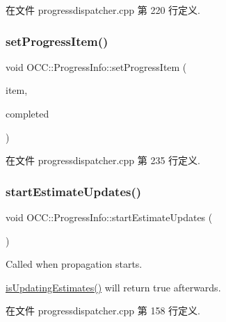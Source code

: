 在文件 progressdispatcher.\+cpp 第 220 行定义.

\mbox{\label{class_o_c_c_1_1_progress_info_ad252ffcad193d4573c318674b1f51e97}} 
\subsubsection{\texorpdfstring{set\+Progress\+Item()}{setProgressItem()}}
{\footnotesize\ttfamily void O\+C\+C\+::\+Progress\+Info\+::set\+Progress\+Item (\begin{DoxyParamCaption}\item[{const \hyperlink{class_o_c_c_1_1_sync_file_item}{Sync\+File\+Item} \&}]{item,  }\item[{quint64}]{completed }\end{DoxyParamCaption})}



在文件 progressdispatcher.\+cpp 第 235 行定义.

\mbox{\label{class_o_c_c_1_1_progress_info_a07894c5202d9f21cb23ce308900c8415}} 
\subsubsection{\texorpdfstring{start\+Estimate\+Updates()}{startEstimateUpdates()}}
{\footnotesize\ttfamily void O\+C\+C\+::\+Progress\+Info\+::start\+Estimate\+Updates (\begin{DoxyParamCaption}{ }\end{DoxyParamCaption})}

Called when propagation starts.

\hyperlink{class_o_c_c_1_1_progress_info_adcc9c47a252a15e9866059ea127c0b08}{is\+Updating\+Estimates()} will return true afterwards. 

在文件 progressdispatcher.\+cpp 第 158 行定义.

\mbox{\label{class_o_c_c_1_1_progress_info_a031d811d62aa17facd575dc131276f61}} 
